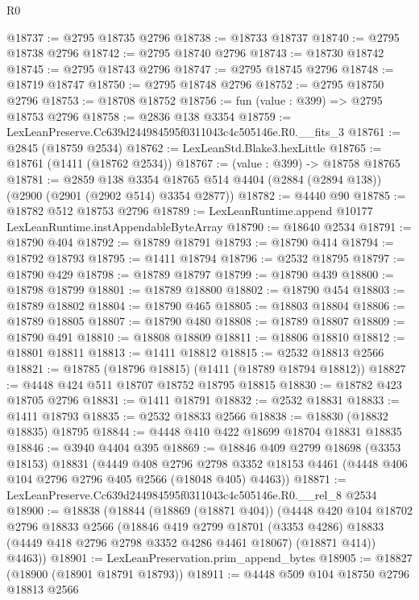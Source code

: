 \begin{lexlean}{R0}
\begin{coremodule}
@18737 := @2795 @18735 @2796
@18738 := @18733 @18737
@18740 := @2795 @18738 @2796
@18742 := @2795 @18740 @2796
@18743 := @18730 @18742
@18745 := @2795 @18743 @2796
@18747 := @2795 @18745 @2796
@18748 := @18719 @18747
@18750 := @2795 @18748 @2796
@18752 := @2795 @18750 @2796
@18753 := @18708 @18752
@18756 := fun (value : @399) => @2795 @18753 @2796
@18758 := @2836 @138 @3354
@18759 := LexLeanPreserve.Cc639d244984595f0311043c4c505146e.R0.__fits_3
@18761 := @2845 (@18759 @2534)
@18762 := LexLeanStd.Blake3.hexLittle
@18765 := @18761 (@1411 (@18762 @2534))
@18767 := (value : @399) -> @18758 @18765
@18781 := @2859
    @138
    @3354
    @18765
    @514
    @4404
    (@2884 (@2894 @138))
    (@2900 (@2901 (@2902 @514) @3354 @2877))
@18782 := @4440 @90
@18785 := @18782 @512 @18753 @2796
@18789 := LexLeanRuntime.append @10177 LexLeanRuntime.instAppendableByteArray
@18790 := @18640 @2534
@18791 := @18790 @404
@18792 := @18789 @18791
@18793 := @18790 @414
@18794 := @18792 @18793
@18795 := @1411 @18794
@18796 := @2532 @18795
@18797 := @18790 @429
@18798 := @18789 @18797
@18799 := @18790 @439
@18800 := @18798 @18799
@18801 := @18789 @18800
@18802 := @18790 @454
@18803 := @18789 @18802
@18804 := @18790 @465
@18805 := @18803 @18804
@18806 := @18789 @18805
@18807 := @18790 @480
@18808 := @18789 @18807
@18809 := @18790 @491
@18810 := @18808 @18809
@18811 := @18806 @18810
@18812 := @18801 @18811
@18813 := @1411 @18812
@18815 := @2532 @18813 @2566
@18821 := @18785 (@18796 @18815) (@1411 (@18789 @18794 @18812))
@18827 := @4448 @424 @511 @18707 @18752 @18795 @18815
@18830 := @18782 @423 @18705 @2796
@18831 := @1411 @18791
@18832 := @2532 @18831
@18833 := @1411 @18793
@18835 := @2532 @18833 @2566
@18838 := @18830 (@18832 @18835) @18795
@18844 := @4448 @410 @422 @18699 @18704 @18831 @18835
@18846 := @3940 @4404 @395
@18869 := @18846
    @409
    @2799
    @18698
    (@3353 @18153)
    @18831
    (@4449
      @408
      @2796
      @2798
      @3352
      @18153
      @4461
      (@4448 @406 @104 @2796 @2796 @405 @2566 (@18048 @405) @4463))
@18871 := LexLeanPreserve.Cc639d244984595f0311043c4c505146e.R0.__rel_8 @2534
@18900 := @18838
    (@18844
      (@18869 (@18871 @404))
      (@4448
        @420
        @104
        @18702
        @2796
        @18833
        @2566
        (@18846
          @419
          @2799
          @18701
          (@3353 @4286)
          @18833
          (@4449 @418 @2796 @2798 @3352 @4286 @4461 @18067)
          (@18871 @414))
        @4463))
@18901 := LexLeanPreservation.prim_append_bytes
@18905 := @18827 (@18900 (@18901 @18791 @18793))
@18911 := @4448 @509 @104 @18750 @2796 @18813 @2566

\end{coremodule}
\end{lexlean}
